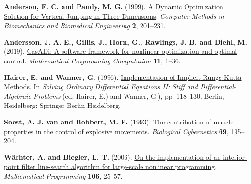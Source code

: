 \documentclass[
  11pt,
  a4paper]{article}
\newlength{\cslhangindent}
\newenvironment{CSLReferences}[2] %
 {\begin{list}{}{%
  \setlength{\itemindent}{0pt}
  \setlength{\leftmargin}{0pt}
  \setlength{\parsep}{0pt}
  \ifodd #1
   \setlength{\leftmargin}{\cslhangindent}
   \setlength{\itemindent}{-1\cslhangindent}
  \fi
  \setlength{\itemsep}{#2\baselineskip}}}
 {\end{list}}
\begin{document}
\protect{}\label{refs}
\begin{CSLReferences}{1}{1}
\textbf{Anderson, F. C. and Pandy, M. G.} (1999).
\href{https://doi.org/10.1080/10255849908907988}{A {Dynamic}
{Optimization} {Solution} for {Vertical} {Jumping} in {Three}
{Dimensions}}. \emph{Computer Methods in Biomechanics and Biomedical
Engineering} \textbf{2}, 201--231.

\textbf{Andersson, J. A. E., Gillis, J., Horn, G., Rawlings, J. B. and
Diehl, M.} (2019).
\href{https://doi.org/10.1007/s12532-018-0139-4}{{CasADi}: A software
framework for nonlinear optimization and optimal control}.
\emph{Mathematical Programming Computation} \textbf{11}, 1--36.

\textbf{Hairer, E. and Wanner, G.} (1996).
\href{https://doi.org/10.1007/978-3-642-05221-7_8}{Implementation of
{Implicit} {Runge}-{Kutta} {Methods}}. In \emph{Solving {Ordinary}
{Differential} {Equations} {II}: {Stiff} and {Differential}-{Algebraic}
{Problems}} (ed. Hairer, E.) and Wanner, G.), pp. 118--130. Berlin,
Heidelberg: Springer Berlin Heidelberg.

\textbf{Soest, A. J. van and Bobbert, M. F.} (1993).
\href{https://doi.org/10.1007/BF00198959}{The contribution of muscle
properties in the control of explosive movements}. \emph{Biological
Cybernetics} \textbf{69}, 195--204.

\textbf{Wächter, A. and Biegler, L. T.} (2006).
\href{https://doi.org/10.1007/s10107-004-0559-y}{On the implementation
of an interior-point filter line-search algorithm for large-scale
nonlinear programming}. \emph{Mathematical Programming} \textbf{106},
25--57.

\end{CSLReferences}
\end{document}
